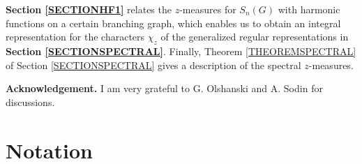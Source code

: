 \documentclass[12pt]{amsart}
\theoremstyle{definition}
\numberwithin{equation}{section}
\begin{document}
\textbf{Section \ref{SECTIONHF1}} relates the $z$-measures for $S_n(G)$ with harmonic functions on a certain branching graph, which enables us to obtain an integral representation
for the characters $\chi_z$ of the generalized regular representations in \textbf{Section \ref{SECTIONSPECTRAL}}.
Finally, Theorem \ref{THEOREMSPECTRAL} of Section \ref{SECTIONSPECTRAL} gives a description of the spectral
$z$-measures.

\textbf{Acknowledgement.} I am very grateful to G. Olshanski and A. Sodin for discussions.































\section{Notation}\label{SECTIONNOTATION}
\end{document}
